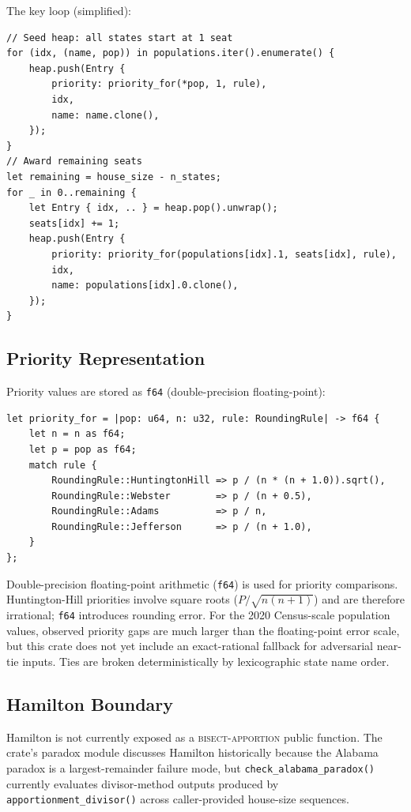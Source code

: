 The key loop (simplified):
\begin{verbatim}
// Seed heap: all states start at 1 seat
for (idx, (name, pop)) in populations.iter().enumerate() {
    heap.push(Entry {
        priority: priority_for(*pop, 1, rule),
        idx,
        name: name.clone(),
    });
}
// Award remaining seats
let remaining = house_size - n_states;
for _ in 0..remaining {
    let Entry { idx, .. } = heap.pop().unwrap();
    seats[idx] += 1;
    heap.push(Entry {
        priority: priority_for(populations[idx].1, seats[idx], rule),
        idx,
        name: populations[idx].0.clone(),
    });
}
\end{verbatim}

\subsection{Priority Representation}

Priority values are stored as \texttt{f64} (double-precision floating-point):

\begin{verbatim}
let priority_for = |pop: u64, n: u32, rule: RoundingRule| -> f64 {
    let n = n as f64;
    let p = pop as f64;
    match rule {
        RoundingRule::HuntingtonHill => p / (n * (n + 1.0)).sqrt(),
        RoundingRule::Webster        => p / (n + 0.5),
        RoundingRule::Adams          => p / n,
        RoundingRule::Jefferson      => p / (n + 1.0),
    }
};
\end{verbatim}

Double-precision floating-point arithmetic (\texttt{f64}) is used for
priority comparisons.
Huntington-Hill priorities involve square roots ($P / \sqrt{n(n+1)}$) and
are therefore irrational; \texttt{f64} introduces rounding error.
For the 2020 Census-scale population values, observed priority gaps are much
larger than the floating-point error scale, but this crate does not yet include
an exact-rational fallback for adversarial near-tie inputs.
Ties are broken deterministically by lexicographic state name order.

\subsection{Hamilton Boundary}

Hamilton is not currently exposed as a \textsc{bisect-apportion} public
function.  The crate's paradox module discusses Hamilton historically because
the Alabama paradox is a largest-remainder failure mode, but
\texttt{check\_alabama\_paradox()} currently evaluates divisor-method outputs
produced by \texttt{apportionment\_divisor()} across caller-provided house-size
sequences.
